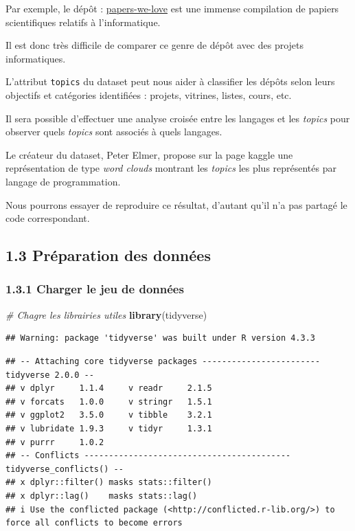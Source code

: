 \documentclass[
]{article}
\newenvironment{Shaded}{\begin{snugshade}}{\end{snugshade}}
\newcommand{\CommentTok}[1]{\textcolor[rgb]{0.56,0.35,0.01}{\textit{#1}}}
\newcommand{\FunctionTok}[1]{\textcolor[rgb]{0.13,0.29,0.53}{\textbf{#1}}}
\newcommand{\NormalTok}[1]{#1}
\begin{document}
Par exemple, le dépôt :
\href{https://github.com/papers-we-love/papers-we-love}{papers-we-love}
est une immense compilation de papiers scientifiques relatifs à
l'informatique.

Il est donc très difficile de comparer ce genre de dépôt avec des
projets informatiques.

L'attribut \texttt{topics} du dataset peut nous aider à classifier les
dépôts selon leurs objectifs et catégories identifiées : projets,
vitrines, listes, cours, etc.

Il sera possible d'effectuer une analyse croisée entre les langages et
les \emph{topics} pour observer quels \emph{topics} sont associés à
quels langages.

Le créateur du dataset, Peter Elmer, propose sur la page kaggle une
représentation de type \emph{word clouds} montrant les \emph{topics} les
plus représentés par langage de programmation.

Nous pourrons essayer de reproduire ce résultat, d'autant qu'il n'a pas
partagé le code correspondant.

\subsection{1.3 Préparation des
données}\label{pruxe9paration-des-donnuxe9es}

\subsubsection{1.3.1 Charger le jeu de
données}\label{charger-le-jeu-de-donnuxe9es}

\begin{Shaded}
\begin{Highlighting}[]
\CommentTok{\# Chagre les librairies utiles}
\FunctionTok{library}\NormalTok{(tidyverse)}
\end{Highlighting}
\end{Shaded}

\begin{verbatim}
## Warning: package 'tidyverse' was built under R version 4.3.3
\end{verbatim}

\begin{verbatim}
## -- Attaching core tidyverse packages ------------------------ tidyverse 2.0.0 --
## v dplyr     1.1.4     v readr     2.1.5
## v forcats   1.0.0     v stringr   1.5.1
## v ggplot2   3.5.0     v tibble    3.2.1
## v lubridate 1.9.3     v tidyr     1.3.1
## v purrr     1.0.2     
## -- Conflicts ------------------------------------------ tidyverse_conflicts() --
## x dplyr::filter() masks stats::filter()
## x dplyr::lag()    masks stats::lag()
## i Use the conflicted package (<http://conflicted.r-lib.org/>) to force all conflicts to become errors
\end{verbatim}
\end{document}
